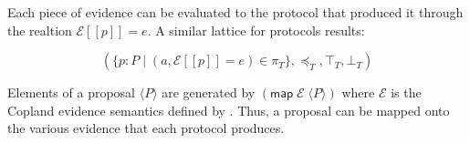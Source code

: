 \documentclass[sigconf,authordraft]{acmart}
\begin{document}
Each piece of evidence can be evaluated to the protocol that produced it through the realtion $\mathcal{E}[\![p]\!]=e$. A similar lattice for protocols results:

\[(\{p:P\mid
  (a,\mathcal{E}[\![p]\!]=e)\in\pi_T\},\preceq_T,\top_T,\bot_T)\]

Elements of a proposal $\langle P\rangle$ are generated by
$(\mathsf{map}\; \mathcal{E}\; \langle P\rangle)$ where $\mathcal{E}$
is the Copland evidence semantics defined by \citet{Ramsdell:2019aa}.
Thus, a proposal can be mapped onto the various evidence that each
protocol produces.

\nocite{Coker::Principles-of-R,Ramsdell:2019aa,Petz:2019aa,Davey:02:Introduction-to}

 
\end{document}
